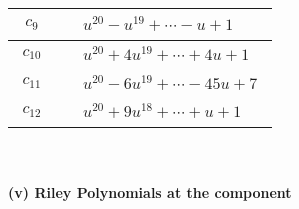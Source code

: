 \documentclass[1p]{elsarticle_modified}
\theoremstyle{definition}
\begin{document}
\begin{tabular}{m{50pt}|m{274pt}}
\hline $$\begin{aligned}c_{9}\end{aligned}$$&$\begin{aligned}
&u^{20}- u^{19}+\cdots- u+1
\end{aligned}$\\
\hline $$\begin{aligned}c_{10}\end{aligned}$$&$\begin{aligned}
&u^{20}+4 u^{19}+\cdots+4 u+1
\end{aligned}$\\
\hline $$\begin{aligned}c_{11}\end{aligned}$$&$\begin{aligned}
&u^{20}-6 u^{19}+\cdots-45 u+7
\end{aligned}$\\
\hline $$\begin{aligned}c_{12}\end{aligned}$$&$\begin{aligned}
&u^{20}+9 u^{18}+\cdots+u+1
\end{aligned}$\\
\hline
\end{tabular}\\~\\
\newpage\renewcommand{\arraystretch}{1}
\flushleft \textbf{(v) Riley Polynomials at the component}\newline \\
\end{document}
